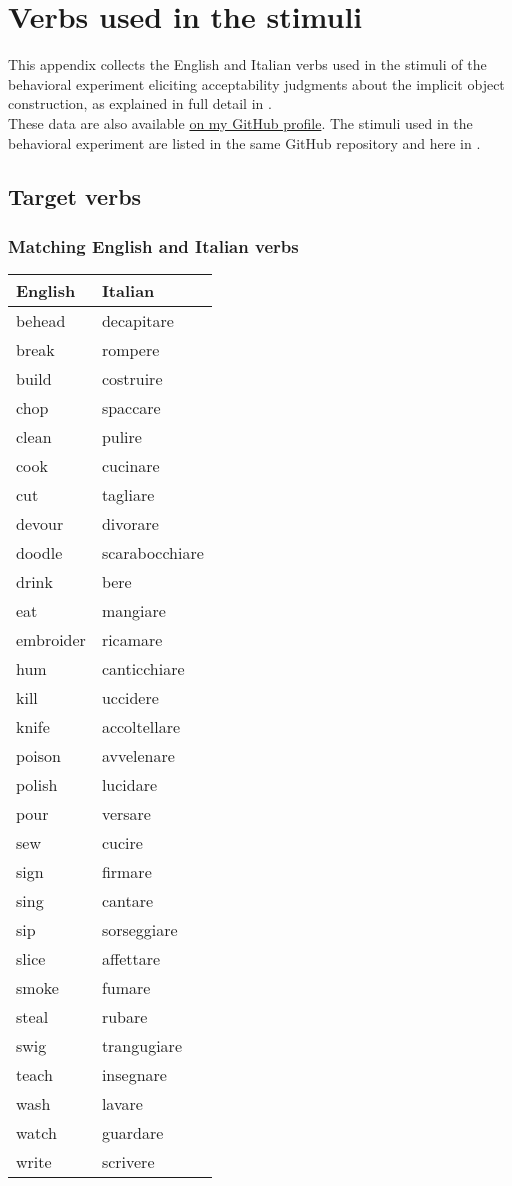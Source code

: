 \setchapterpreamble[u]{\margintoc}
\chapter{Verbs used in the stimuli}

This appendix collects the English and Italian verbs used in the stimuli of the behavioral experiment eliciting acceptability judgments about the implicit object construction, as explained in full detail in .\\
These data are also available \href{https://github.com/giuliacappelli/dissertationData}{on my GitHub profile}. The stimuli used in the behavioral experiment are listed in the same GitHub repository and here in .

\section{Target verbs}

\subsection{Matching English and Italian verbs}

\begin{longtable}{l|l}
\textbf{English}      & \textbf{Italian}    \\
\hline
\endhead
behead	&	decapitare	\\
break	&	rompere	\\
build	&	costruire\\	
chop	&	spaccare	\\
clean	&	pulire	\\
cook	&	cucinare	\\
cut	&	tagliare	\\
devour	&	divorare	\\
doodle	&	scarabocchiare\\	
drink	&	bere	\\
eat	&	mangiare	\\
embroider	&	ricamare	\\
hum	&	canticchiare	\\
kill	&	uccidere	\\
knife	&	accoltellare	\\
poison	&	avvelenare	\\
polish	&	lucidare	\\
pour	&	versare	\\
sew	&	cucire	\\
sign	&	firmare	\\
sing	&	cantare	\\
sip	&	sorseggiare	\\
slice	&	affettare\\	
smoke	&	fumare	\\
steal	&	rubare	\\
swig	&	trangugiare	\\
teach	&	insegnare	\\
wash	&	lavare	\\
watch	&	guardare	\\
write	&	scrivere  
\end{longtable}

